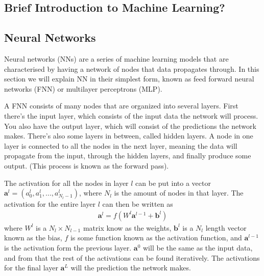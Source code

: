 \subsection{Brief Introduction to Machine Learning?}



\subsection{Neural Networks}

Neural networks (NNs) are a series of machine learning models that are characterised by having a network of nodes that data propagates through. 
In this section we will explain NN in their simplest form, known as feed forward neural networks (FNN) or multilayer perceptrons (MLP). 

A FNN consists of many nodes that are organized into several layers. First there's the input layer, which consists of the input data the network will process. You also have the output layer, which will consist of the predictions the network makes. There's also some layers in between, called hidden layers. A node in one layer is connected to all the nodes in the next layer, meaning the data will propagate from the input, through the hidden layers, and finally produce some output. 
(This process is known as the forward pass).

The activation for all the nodes in layer $l$ can be put into a vector $\mathbf{a}^l = (a^l_{0}, a^l_1, ..., a^{l}_{N_l-1})$, where $N_l$ is the amount of nodes in that layer. %
The activation for the entire layer $l$ can then be written as
\begin{align}
	\mathbf{a}^l = f(W^l \mathbf{a}^{l-1} + \mathbf{b}^{l}) 
\end{align}
where $W^l$ is a $N_l \times N_{l-1}$ matrix know as the weights, $\mathbf{b}^{l}$ is a $N_l$ length vector known as the bias, $f$ is some function known as the activation function, and $\mathbf{a}^{l-1}$ is the activation form the previous layer. $\mathbf{a}^{0}$ will be the same as the input data, and from that the rest of the activations can be found iteratively. The activations for the final layer $\mathbf{a}^L$ will the prediction the network makes.


